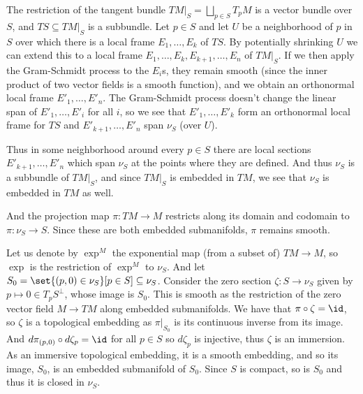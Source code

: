 \eprob

\benum
    \item The restriction of the tangent bundle $TM|_S=\bigsqcup_{p\in S}T_pM$ is a vector bundle over $S$, and $TS\subseteq TM|_S$ is a subbundle.
    Let $p\in S$ and let $U$ be a neighborhood of $p$ in $S$ over which there is a local frame $E_1,\dots,E_k$ of $TS$.
    By potentially shrinking $U$ we can extend this to a local frame $E_1,\dots,E_k,E_{k+1},\dots,E_n$ of $TM|_S$.
    If we then apply the Gram-Schmidt process to the $E_i$s, they remain smooth (since the inner product of two vector fields is a smooth function), and we obtain
    an orthonormal local frame $E'_1,\dots,E'_n$.
    The Gram-Schmidt process doesn't change the linear span of $E'_1,\dots,E'_i$ for all $i$, so we see that $E'_1,\dots,E'_k$ form an orthonormal local
    frame for $TS$ and $E'_{k+1},\dots,E'_n$ span $\nu_S$ (over $U$).

    Thus in some neighborhood around every $p\in S$ there are local sections $E'_{k+1},\dots,E'_n$ which span $\nu_S$ at the points where they are defined.
    And thus $\nu_S$ is a subbundle of $TM|_S$, and since $TM|_S$ is embedded in $TM$, we see that $\nu_S$ is embedded in $TM$ as well.

    And the projection map $\pi\colon TM\to M$ restricts along its domain and codomain to $\pi\colon\nu_S\to S$.
    Since these are both embedded submanifolds, $\pi$ remains smooth.

    \item Let us denote by $\exp^M$ the exponential map (from a subset of) $TM\to M$, so $\exp$ is the restriction of $\exp^M$ to $\nu_S$.
    And let $S_0=\set{(p,0)\in\nu_S}[p\in S]\subseteq\nu_S$.
    Consider the zero section $\zeta\colon S\to\nu_S$ given by $p\mapsto 0\in T_pS^\perp$, whose image is $S_0$.
    This is smooth as the restriction of the zero vector field $M\to TM$ along embedded submanifolds.
    We have that $\pi\circ\zeta=\id$, so $\zeta$ is a topological embedding as $\pi|_{S_0}$ is its continuous inverse from its image.
    And $d\pi_{(p,0)}\circ d\zeta_p=\id$ for all $p\in S$ so $d\zeta_p$ is injective, thus $\zeta$ is an immersion.
    As an immersive topological embedding, it is a smooth embedding, and so its image, $S_0$, is an embedded submanifold of $S_0$.
    Since $S$ is compact, so is $S_0$ and thus it is closed in $\nu_S$.

